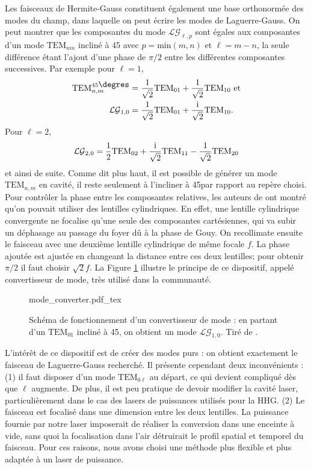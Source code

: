 Les faisceaux de Hermite-Gauss constituent également une base orthonormée des modes du champ, dans laquelle on peut écrire les modes de Laguerre-Gauss. On peut montrer  que les composantes du mode $\mathcal{LG}_{\ell,p}$ sont égales aux composantes d'un mode $\mbox{TEM}_{nm}$ incliné à 45\degres{} avec $p = \mathrm{min}(m,n)$ et $\ell=m-n$, la seule différence étant l'ajout d'une phase de $\pi/2$ entre les différentes composantes successives. Par exemple pour $\ell = 1$,
\begin{align*}
\mbox{TEM}_{n,m}^{45\mbox{\degres}}&=\frac{1}{\sqrt{2}}\mbox{TEM}_{01}+\frac{1}{\sqrt{2}}\mbox{TEM}_{10} \mbox{ et}\\
\mathcal{LG}_{1,0}&=\frac{1}{\sqrt{2}}\mbox{TEM}_{01}+\frac{\rmi}{\sqrt{2}}\mbox{TEM}_{10}.
\end{align*}
Pour $\ell = 2$, 
\begin{equation*}
\mathcal{LG}_{2,0}=\frac{1}{2}\mbox{TEM}_{02}+\frac{\mathrm{i}}{\sqrt{2}}\mbox{TEM}_{11}-\frac{1}{\sqrt{2}}\mbox{TEM}_{20}
\end{equation*}
et ainsi de suite.
Comme dit plus haut, il est possible de générer un mode $\mbox{TEM}_{n,m}$ en cavité, il reste seulement à l'incliner à 45\degres par rapport au repère choisi. Pour contrôler la phase entre les composantes relatives, les auteurs de  ont montré qu'on pouvait utiliser des lentilles cylindriques. En effet, une lentille cylindrique convergente ne focalise qu'une seule des composantes cartésiennes, qui va subir un déphasage au passage du foyer dû à la phase de Gouy. On recollimate ensuite le faisceau avec une deuxième lentille cylindrique de même focale $f$. La phase ajoutée est ajustée en changeant la distance entre ces deux lentilles; pour obtenir $\pi/2$ il faut choisir $\sqrt{2}f$. La Figure \ref{Fig:Modeconv} illustre le principe de ce dispositif, appelé convertisseur de mode, très utilisé dans la communauté.

\begin{figure}[!ht]
\centering
\def\svgwidth{0.5\columnwidth}
{mode_converter.pdf_tex}
\caption{Schéma de fonctionnement d'un convertisseur de mode : en partant d'un $\mbox{TEM}_{01}$ incliné à 45\degres, on obtient un mode $\mathcal{LG}_{1,0}$. Tiré de .}
\label{Fig:Modeconv}
\end{figure}

L'intérêt de ce dispositif est de créer des modes purs : on obtient exactement le faisceau de Laguerre-Gauss recherché. Il présente cependant deux inconvénients : (1) il faut disposer d'un mode $\mbox{TEM}_{0\ell}$ au départ, ce qui devient compliqué dès que $\ell$ augmente. De plus, il est peu pratique de devoir modifier la cavité laser, particulièrement dans le cas des lasers de puissances utilisés pour la HHG. (2) Le faisceau est focalisé dans une dimension entre les deux lentilles. La puissance fournie par notre laser imposerait de réaliser la conversion dans une enceinte à vide, sans quoi la focalisation dans l'air détruirait le profil spatial et temporel du faisceau. Pour ces raisons, nous avons choisi une méthode plus flexible et plus adaptée à un laser de puissance.

